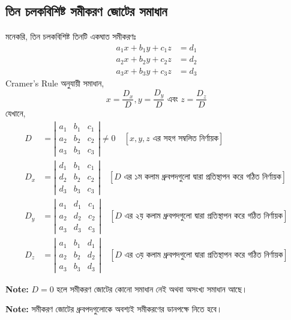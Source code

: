 \subsection{তিন চলকবিশিষ্ট সমীকরণ জোটের সমাধান}
মনেকরি, তিন চলকবিশিষ্ট তিনটি একঘাত সমীকরণঃ
\begin{align}
	a_1x+b_1y+c_1z &= d_1 \tag{1} \\
	a_2x+b_2y+c_2z &= d_2 \tag{2} \\
	a_3x+b_3y+c_3z &= d_3 \tag{3}
\end{align}
Cramer's Rule অনুযায়ী সমাধান, 
\begin{equation*}
	x=\dfrac{D_x}{D}, y=\dfrac{D_y}{D} \text{ এবং } z=\dfrac{D_z}{D}
\end{equation*}
যেখানে, 
\begin{align*}
	D &= \left|\begin{array}{ccc}
	a_1 & b_1 & c_1 \\
	a_2 & b_2 & c_2 \\
	a_3 & b_3 & c_3
	\end{array}\right|\neq  0\quad [x,y,z \text{ এর সহগ সম্বলিত নির্ণায়ক}] \\
	D_x &= \left|\begin{array}{ccc}
	d_1 & b_1 & c_1 \\
	d_2 & b_2 & c_2 \\
	d_3 & b_3 & c_3
	\end{array}\right| \quad [D \text{ এর ১ম কলাম ধ্রুবপদগুলো দ্বারা প্রতিস্থাপন করে গঠিত নির্ণায়ক}]\\
	D_y &= \left|\begin{array}{ccc}
	a_1 & d_1 & c_1 \\
	a_2 & d_2 & c_2 \\
	a_3 & d_3 & c_3
	\end{array}\right| \quad [D \text{ এর ২য় কলাম ধ্রুবপদগুলো দ্বারা প্রতিস্থাপন করে গঠিত নির্ণায়ক}]\\
	D_z &= \left|\begin{array}{ccc}
	a_1 & b_1 & d_1 \\
	a_2 & b_2 & d_2 \\
	a_3 & b_3 & d_3
	\end{array}\right| \quad [D \text{ এর ৩য় কলাম ধ্রুবপদগুলো দ্বারা প্রতিস্থাপন করে গঠিত নির্ণায়ক}]
\end{align*}
\begin{tcolorbox}
	\textbf{Note:} $D=0$ হলে সমীকরণ জোটের কোনো সমাধান নেই অথবা অসংখ্য সমাধান আছে।
\end{tcolorbox}
\begin{tcolorbox}
	\textbf{Note:} সমীকরণ জোটের ধ্রুবপদগুলোকে অবশ্যই সমীকরণের ডানপক্ষে নিতে হবে।
\end{tcolorbox}
